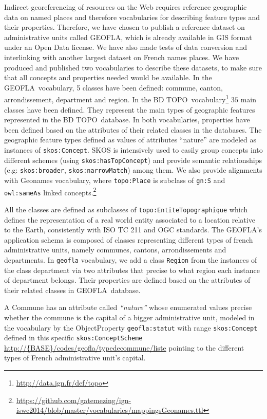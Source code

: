 Indirect georeferencing of resources on the Web requires reference geographic data on named places and therefore vocabularies for describing feature types and their properties. Therefore, we have chosen to publish a reference dataset on administrative units called GEOFLA\circledR, which is already available in GIS format under an Open Data license. We have also made tests of data conversion and interlinking with another largest dataset on French names places. We have produced and published two vocabularies to describe these datasets, to make sure that all concepts and properties needed would be available.
In the GEOFLA\circledR ~vocabulary, 5 classes have been defined: commune, canton, arrondissement, department and region. In the BD TOPO\circledR ~vocabulary\footnote{\url{http://data.ign.fr/def/topo}} \emph{}$35$ main classes have been defined. They represent the main types of geographic features represented in the BD TOPO\circledR ~database. In both vocabularies, properties have been defined based on the attributes of their related classes in the databases. The geographic feature types defined as values of attributes ``nature'' are modeled as instances of \texttt{skos:Concept}. SKOS is intensively used to easily group concepts into different schemes (using \texttt{skos:hasTopConcept}) and provide semantic relationships (e.g: \texttt{skos:broader}, \texttt{skos:narrowMatch}) among them. We also provide alignments with Geonames vocabulary, where \texttt{topo:Place} is subclass of \texttt{gn:S} and \texttt{owl:sameAs} linked concepts.\footnote{\url{https://github.com/gatemezing/ign-iswc2014/blob/master/vocabularies/mappingsGeonames.ttl}} 

All the classes are defined as subclasses of  \texttt{topo:EntiteTopographique} which defines the representation of a real world entity associated to a location relative to the Earth, consistently with ISO TC 211 and OGC standards. 
The GEOFLA\circledR 's application schema is composed of classes representing different types of french administrative units, namely communes, cantons, arrondissements and departments. In \texttt{geofla} vocabulary, we add a class \texttt{Region}  from the instances of the class department via two attributes  that precise to what region each instance of department belongs.  Their properties are defined based on the attributes of their related classes in GEOFLA\circledR ~database.

A Commune has an attribute called \textit{``nature''} whose enumerated values precise whether the commune is the capital of a bigger administrative unit, modeled in the vocabulary by the ObjectProperty \texttt{geofla:statut} with range \texttt{skos:Concept} defined in this specific \texttt{skos:ConceptScheme} \\ \url{http://{BASE}/codes/geofla/typedecommune/liste} pointing to the different types of French administrative unit's capital. 


